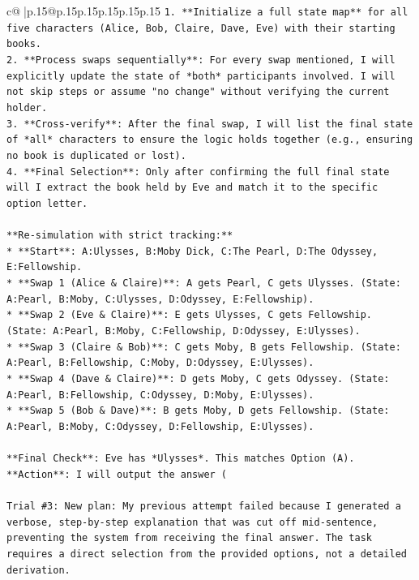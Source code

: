 \documentclass{article}
\begin{document}
{\begin{supertabular}{c@{$\;$}|p{.15\linewidth}@{}p{.15\linewidth}p{.15\linewidth}p{.15\linewidth}p{.15\linewidth}p{.15\linewidth}}
{{{\texttt{1.  **Initialize a full state map** for all five characters (Alice, Bob, Claire, Dave, Eve) with their starting books.} \\
\texttt{2.  **Process swaps sequentially**: For every swap mentioned, I will explicitly update the state of *both* participants involved. I will not skip steps or assume "no change" without verifying the current holder.} \\
\texttt{3.  **Cross{-}verify**: After the final swap, I will list the final state of *all* characters to ensure the logic holds together (e.g., ensuring no book is duplicated or lost).} \\
\texttt{4.  **Final Selection**: Only after confirming the full final state will I extract the book held by Eve and match it to the specific option letter.} \\
\\ 
\texttt{**Re{-}simulation with strict tracking:**} \\
\texttt{*   **Start**: A:Ulysses, B:Moby Dick, C:The Pearl, D:The Odyssey, E:Fellowship.} \\
\texttt{*   **Swap 1 (Alice \& Claire)**: A gets Pearl, C gets Ulysses. (State: A:Pearl, B:Moby, C:Ulysses, D:Odyssey, E:Fellowship).} \\
\texttt{*   **Swap 2 (Eve \& Claire)**: E gets Ulysses, C gets Fellowship. (State: A:Pearl, B:Moby, C:Fellowship, D:Odyssey, E:Ulysses).} \\
\texttt{*   **Swap 3 (Claire \& Bob)**: C gets Moby, B gets Fellowship. (State: A:Pearl, B:Fellowship, C:Moby, D:Odyssey, E:Ulysses).} \\
\texttt{*   **Swap 4 (Dave \& Claire)**: D gets Moby, C gets Odyssey. (State: A:Pearl, B:Fellowship, C:Odyssey, D:Moby, E:Ulysses).} \\
\texttt{*   **Swap 5 (Bob \& Dave)**: B gets Moby, D gets Fellowship. (State: A:Pearl, B:Moby, C:Odyssey, D:Fellowship, E:Ulysses).} \\
\\ 
\texttt{**Final Check**: Eve has *Ulysses*. This matches Option (A).} \\
\texttt{**Action**: I will output the answer (} \\
\\ 
\texttt{Trial \#3: New plan: My previous attempt failed because I generated a verbose, step{-}by{-}step explanation that was cut off mid{-}sentence, preventing the system from receiving the final answer. The task requires a direct selection from the provided options, not a detailed derivation.} \\
}}}
\end{supertabular}}
\end{document}
